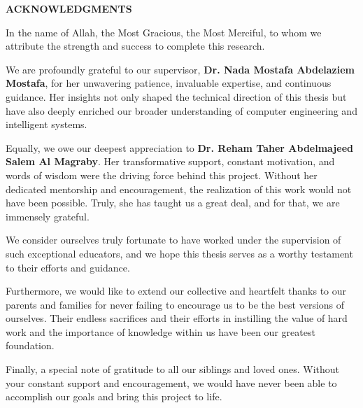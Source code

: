 \newpage
\thispagestyle{plain} 

\begin{center}
    \Large \textbf{ACKNOWLEDGMENTS}
\end{center}
\vspace{0.8cm}

\normalsize
\noindent In the name of Allah, the Most Gracious, the Most Merciful, to whom we attribute the strength and success to complete this research.\par\vspace{0.4cm}

We are profoundly grateful to our supervisor, \textbf{Dr. Nada Mostafa Abdelaziem Mostafa}, for her unwavering patience, invaluable expertise, and continuous guidance. Her insights not only shaped the technical direction of this thesis but have also deeply enriched our broader understanding of computer engineering and intelligent systems.\par\vspace{0.4cm}

Equally, we owe our deepest appreciation to \textbf{Dr. Reham Taher Abdelmajeed Salem Al Magraby}. Her transformative support, constant motivation, and words of wisdom were the driving force behind this project. Without her dedicated mentorship and encouragement, the realization of this work would not have been possible. Truly, she has taught us a great deal, and for that, we are immensely grateful.\par\vspace{0.4cm}

We consider ourselves truly fortunate to have worked under the supervision of such exceptional educators, and we hope this thesis serves as a worthy testament to their efforts and guidance.\par\vspace{0.4cm}

Furthermore, we would like to extend our collective and heartfelt thanks to our parents and families for never failing to encourage us to be the best versions of ourselves. Their endless sacrifices and their efforts in instilling the value of hard work and the importance of knowledge within us have been our greatest foundation.\par\vspace{0.4cm}

Finally, a special note of gratitude to all our siblings and loved ones. Without your constant support and encouragement, we would have never been able to accomplish our goals and bring this project to life.